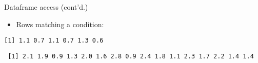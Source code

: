 \documentclass[8pt,ignorenonframetext,]{beamer}
\newenvironment{Shaded}{\begin{snugshade}}{\end{snugshade}}
\newcommand{\StringTok}[1]{\textcolor[rgb]{0.31,0.60,0.02}{#1}}
\newcommand{\OperatorTok}[1]{\textcolor[rgb]{0.81,0.36,0.00}{\textbf{#1}}}
\newcommand{\NormalTok}[1]{#1}
\providecommand{\tightlist}{%
  \setlength{\itemsep}{0pt}\setlength{\parskip}{0pt}}
\begin{document}
\begin{frame}[fragile]{Dataframe access (cont'd.)}

\begin{itemize}
\tightlist
\item
  Rows matching a condition:
\end{itemize}

\begin{Shaded}
\end{Shaded}

\begin{verbatim}
[1] 1.1 0.7 1.1 0.7 1.3 0.6
\end{verbatim}

\begin{Shaded}
\end{Shaded}

\begin{verbatim}
 [1] 2.1 1.9 0.9 1.3 2.0 1.6 2.8 0.9 2.4 1.8 1.1 2.3 1.7 2.2 1.4 1.4
\end{verbatim}

\end{frame}
\end{document}
